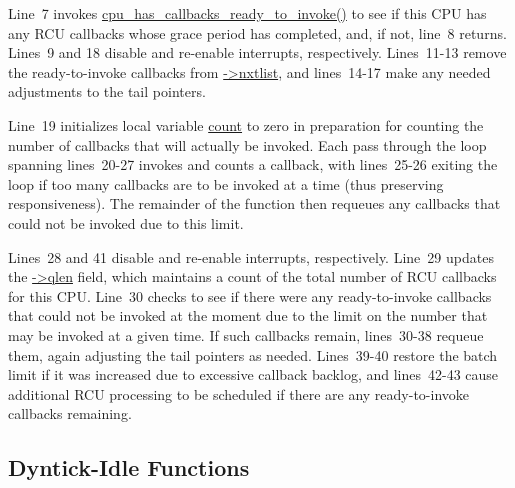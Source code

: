  \QuickQuizEnd

Line~7 invokes \url{cpu_has_callbacks_ready_to_invoke()} to see if
this CPU has any RCU callbacks whose grace period has completed,
and, if not, line~8 returns.
Lines~9 and 18 disable and re-enable interrupts, respectively.
Lines~11-13 remove the ready-to-invoke callbacks from \url{->nxtlist},
and lines~14-17 make any needed adjustments to the tail pointers.

 \QuickQuizEnd

Line~19 initializes local variable \url{count} to zero in preparation
for counting the number of callbacks that will actually be invoked.
Each pass through the loop spanning lines~20-27 invokes and counts
a callback, with lines~25-26 exiting the loop if too many callbacks
are to be invoked at a time (thus preserving responsiveness).
The remainder of the function then requeues any callbacks that could
not be invoked due to this limit.

Lines~28 and 41 disable and re-enable interrupts, respectively.
Line~29 updates the \url{->qlen} field, which maintains a count
of the total number of RCU callbacks for this CPU.
Line~30 checks to see if there were any ready-to-invoke callbacks
that could not be invoked at the moment due to the limit on the
number that may be invoked at a given time.
If such callbacks remain, lines~30-38 requeue them, again adjusting
the tail pointers as needed.
Lines~39-40 restore the batch limit if it was increased due to
excessive callback backlog, and lines~42-43 cause additional RCU
processing to be scheduled if there are any ready-to-invoke
callbacks remaining.

\subsection{Dyntick-Idle Functions}
\label{app:rcuimpl:rcutreewt:Dyntick-Idle Functions}

